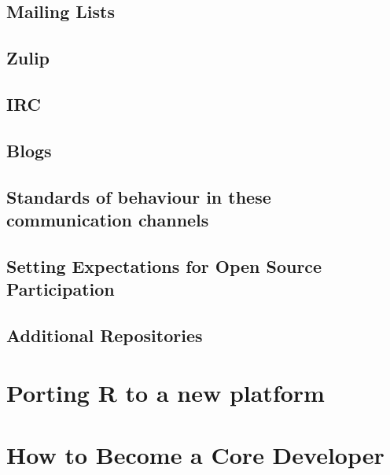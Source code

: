 \documentclass[]{book}
\begin{document}
\hypertarget{mailing-lists-1}{%
\section{Mailing Lists}\label{mailing-lists-1}}

\hypertarget{zulip-1}{%
\section{Zulip}\label{zulip-1}}

\hypertarget{irc}{%
\section{IRC}\label{irc}}

\hypertarget{blogs}{%
\section{Blogs}\label{blogs}}

\hypertarget{standards-of-behaviour-in-these-communication-channels}{%
\section{Standards of behaviour in these communication channels}\label{standards-of-behaviour-in-these-communication-channels}}

\hypertarget{setting-expectations-for-open-source-participation}{%
\section{Setting Expectations for Open Source Participation}\label{setting-expectations-for-open-source-participation}}

\hypertarget{additional-repositories}{%
\section{Additional Repositories}\label{additional-repositories}}

\hypertarget{porting-r-to-a-new-platform}{%
\chapter{Porting R to a new platform}\label{porting-r-to-a-new-platform}}

\hypertarget{how-to-become-a-core-developer}{%
\chapter{How to Become a Core Developer}\label{how-to-become-a-core-developer}}
\end{document}
